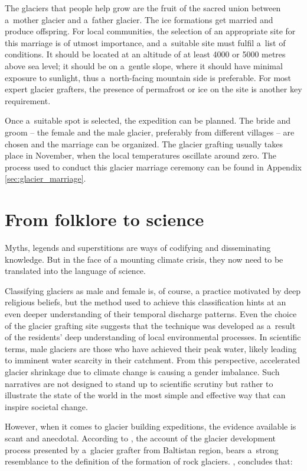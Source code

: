 The glaciers that people help grow are the fruit of the sacred union between a mother glacier and a father
glacier. The ice formations get married and produce offspring. For local communities, the selection of an
appropriate site for this marriage is of utmost importance, and a suitable site must fulfil a list of
conditions. It should be located at an altitude of at least 4000 or 5000 metres above sea level; it should be on
a gentle slope, where it should have minimal exposure to sunlight, thus a north-facing mountain side is
preferable. For most expert glacier grafters, the presence of permafrost or ice on the site is another key
requirement. 

Once a suitable spot is selected, the expedition can be planned. The bride and groom – the female and the male
glacier, preferably from different villages – are chosen and the marriage can be organized. The glacier grafting
usually takes place in November, when the local temperatures oscillate around zero. The process used to conduct
this glacier marriage ceremony can be found in Appendix \ref{sec:glacier_marriage}.

\section{From folklore to science}

Myths, legends and superstitions are ways of codifying and disseminating knowledge. But in the face of a
mounting climate crisis, they now need to be translated into the language of science. 

Classifying glaciers as male and female is, of course, a practice motivated by deep religious beliefs, but the
method used to achieve this classification hints at an even deeper understanding of their temporal discharge
patterns. Even the choice of the glacier grafting site suggests that the technique was developed as a result of
the residents' deep understanding of local environmental processes. In scientific terms, male glaciers are those
who have achieved their peak water, likely leading to imminent water scarcity in their catchment. From this
perspective, accelerated glacier shrinkage due to climate change is causing a gender imbalance.  Such narratives
are not designed to stand up to scientific scrutiny but rather to illustrate the state of the world in the most
simple and effective way that can inspire societal change. 

However, when it comes to glacier building expeditions, the evidence available is scant and anecdotal. According
to \citet{tveitenGlacierGrowingLocal2007}, the account of the glacier development process presented by a glacier
grafter from Baltistan region, bears a strong resemblance to the definition of the formation of rock glaciers.
\citet{tveitenGlacierGrowingLocal2007}, concludes that: 


